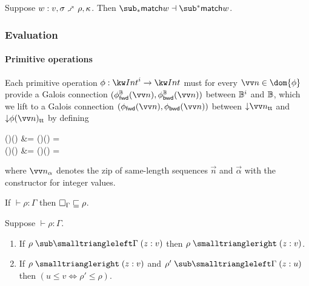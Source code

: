 \begin{theorem}
\label{thm:core-language:match:gc}
   Suppose $w: v, \sigma \matchFwdS \rho, \kappa$.  Then $\matchFwdF{w} \adjoint \matchBwdF{w}$.
\end{theorem}

\subsubsection{Evaluation}

\paragraph{Primitive operations}

Each primitive operation $\phi: \tyInt^{i} \to \tyInt$ must for every $\vec{n} \in \dom{\phi}$ provide a Galois connection $(\primFwdBool{\phi}(\vec{n}), \primBwdBool{\phi}(\vec{n}))$ between $\mathbb{B}^i$ and $\mathbb{B}$, which we lift to a Galois connection $(\primFwd{\phi}(\vec{n}), \primBwd{\phi}(\vec{n}))$ between $\Below{\vec{\annInt{n}{\TT}}}$ and $\Below{\annInt{\phi(\vec{n})}{\TT}}$ by defining
\begin{definition}
\label{def:core-language:primop-gc}
\begin{salign}
   \primFwd{\phi}()() &= 
   \primFwdBool{\phi}()(\vec{\alpha}) = \beta
   \\
   \primBwd{\phi}()() &= 
   \primBwdBool{\phi}()(\beta) = \vec{\alpha}
\end{salign}
\end{definition}

\noindent where $\vec{\annInt{n}{\alpha}}$ denotes the zip of same-length sequences $\vec{n}$ and $\vec{\alpha}$ with the constructor for integer values.






\begin{lemma}
\label{lem:core-language:hole-env}If $\vdash \rho: \Gamma$ then $\square_{\Gamma} \sqsubseteq \rho$.
\end{lemma}

\begin{lemma}
\label{lem:core-language:env-get-put}Suppose $\vdash \rho: \Gamma$.
\begin{enumerate}
   \item \label{lem:core-language:env-get-put:1} If $\envLookupBwd{\rho}{\Gamma}{\bind{z}{v}}$ then $\envLookup{\rho}{z}{v}$.
   \item \label{lem:core-language:env-get-put:2} If $\envLookup{\rho}{z}{v}$ and $\envLookupBwd{\rho'}{\Gamma}{\bind{z}{u}}$ then $(u \leq v \iff \rho' \leq \rho)$.
\end{enumerate}
\end{lemma}

